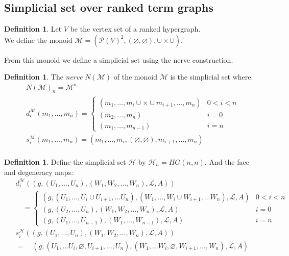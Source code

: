 \documentclass[12pt]{article}
\theoremstyle{definition}
\newtheorem{definition}[theorem]{Definition}
\renewcommand{\P}{\mathcal{P}}
\newcommand{\1}{\mathbbm{1}}
\renewcommand{\L}{\mathcal{L}}
\newcommand{\M}{\mathcal{M}}
\renewcommand{\H}{\mathcal{H}}
\begin{document}
\subsection{Simplicial set over ranked term graphs}
\begin{definition}
    Let $V$ be the vertex set of a ranked hypergraph.\\
    We define the monoid $\M = (\P(V)^2, (\varnothing, \varnothing), \cup\times\cup)$. 
\end{definition}

From this monoid we define a simplicial set using the nerve construction.

\begin{definition}
    The \emph{nerve} $N(\M)$ of the monoid $\M$ is the simplicial set where:
    \begin{align*}
        N(\M)_n = \M^n\\
        d^{\M}_i(m_1,\dots,m_n) = 
        \begin{cases}
            (m_1,\dots,m_i \cup\times\cup m_{i+1}, \dots, m_n) & 0 < i < n\\
            (m_2,\dots, m_n) & i = 0\\
            (m_1,\dots,m_{n-1}) & i = n
        \end{cases}\\
        s^{\M}_i(m_1,\dots,m_n) = (m_1, \dots, m_i, (\varnothing, \varnothing), m_{i+1}, \dots, m_n)\\
    \end{align*}
\end{definition}

\begin{definition}
Define the simplicial set $\H$ by $\H_n = HG(n,n)$. And the face and degeneracy maps:
\begin{align*}
    &d_i^{\H} ((g, (U_1, \dots, U_n), (W_1, W_2, \dots, W_n), \L, A))\\
    &\quad=\begin{cases}
        (g, (U_1, \dots, U_i\cup U_{i+1}, \dots U_n), (W_1, \dots, W_i\cup W_{i+1}, \dots W_n), \L, A) & 0 < i < n\\
        (g, (U_2, \dots, U_n), (W_1, W_2, \dots, W_n), \L, A) & i = 0\\
        (g, (U_1, \dots, U_{n-1}), (W_1, \dots, W_{n-1}), \L, A) & i = n
    \end{cases}\\
    \hspace{5pt}
    &s_i^{\H}((g, (U_1, \dots, U_n), (W_1, W_2, \dots, W_n), \L, A))\\
    &=\quad (g, (U_1, \dots U_i, \varnothing, U_{i+1}, \dots, U_n), (W_1, \dots W_i, \varnothing, W_{i+1}, \dots, W_n), \L, A)
\end{align*}
\end{definition}
\end{document}
